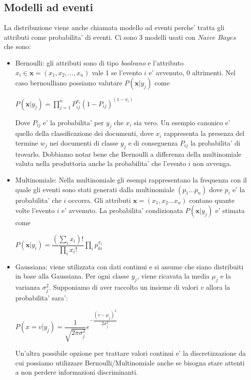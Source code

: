 \subsection{Modelli ad eventi}  
   La distribuzione viene anche chiamata modello ad eventi perche' tratta gli attributi come probabilita' di eventi. Ci sono 3 modelli usati con $\textit{Naive Bayes}$ che sono:
\begin{itemize}
	\item Bernoulli: gli attributi sono di tipo \textit{booleano} e l'attributo $x_i \in \textbf{x}=(x_1,x_2,...,x_n)$ vale 1 se l'evento $i$ e' avvenuto, 0 altrimenti. Nel caso bernoulliano possiamo valutare $P(\textbf{x}|y_j)$ come
	\begin{center}
	 $P(\textbf{x}|y_j) = \prod_{j=1}^{n} P_{ij}^{x_i} (1-P_{ij})^{(1-x_i)}$
	\end{center}
	Dove $P_{ij}$ e' la probabilita' per $y_j$ che $x_i$ sia vero. Un esempio canonico e' quello della classificazione dei documenti, dove $x_i$ rappresenta la presenza del termine $w_j$ nei documenti di classe $y_j$ e di conseguenza $P_{ij}$ la probabilita' di trovarlo. Dobbiamo notar bene che Bernoulli a differenza della multinomiale valuta nella produttoria anche la probabilita' che l'evento $i$ non avvenga.
	

	\item Multinomiale: Nella multinomiale gli esempi rappresentano la frequenza con il quale gli eventi sono stati generati dalla multinomiale $(p_1...p_n)$ dove $p_i$ e' la probabilita' che $i$ occorra. Gli attributi $\textbf{x}=(x_1,x_2...x_n)$ contano quante volte l'evento $i$ e' avvenuto. La probabilita' condizionata  $P(\textbf{x}|y_j)$ e' stimata come
	\begin{center}
		$P(\textbf{x}|y_i) = \dfrac{(\sum_{i}x_i)!}{\prod_{i}x_i!}\prod_i p_{ki}^{x_i}$
	\end{center}
	\item Gaussiana: viene utilizzata con dati continui e si assume che siano distribuiti in base alla Gaussiana. Per ogni classe $y_j$, viene ricavata la media $\mu_j$ e la varianza $\sigma_{j}^{2}$. Supponiamo di aver raccolto un insieme di valori $v$ allora la probabilita' sara':
	\begin{center}
		$P(x =v | y_j) = \dfrac{1}{\sqrt{2 \pi \sigma_{j}^2}} e^{-\dfrac{(v - \mu_j)^2}{2 \sigma_{j}^2}}$
	\end{center}
	Un'altra possibile opzione per trattare valori continui e' la discretizzazione da cui possiamo utilizzare Bernoulli/Multinomiale anche se bisogna stare attenti a non perdere informazioni discriminanti.
\end{itemize}

